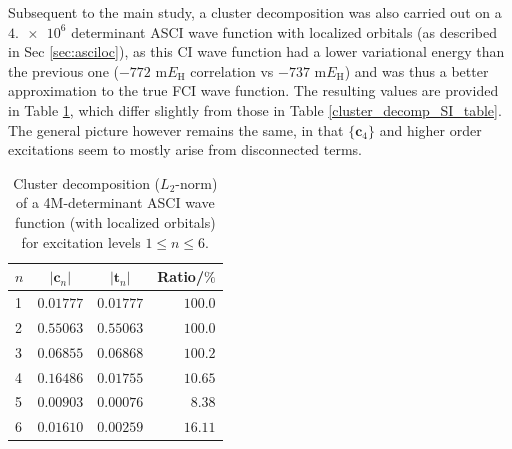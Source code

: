 \documentclass[journal=jcp,manuscript=suppinfo]{achemso}
\begin{document}
Subsequent to the main study, a cluster decomposition was also carried out on a $\num{4.e6}$ determinant ASCI wave function with localized orbitals (as described in Sec \ref{sec:asciloc}), as this CI wave function had a lower variational energy than the previous one ($-772$ m$E_{\text{H}}$ correlation vs $-737$ m$E_{\text{H}}$) and was thus a better approximation to the true FCI wave function. The resulting values are provided in Table \ref{cluster_decomp_SI_table2}, which differ slightly from those in Table \ref{cluster_decomp_SI_table}. The general picture however remains the same, in that $\{\bm{c}_4\}$ and higher order excitations seem to mostly arise from disconnected terms. 

\begin{table}[ht!]
	\begin{center}
		\caption{Cluster decomposition ($L_2$-norm) of a 4M-determinant ASCI wave function (with localized orbitals) for excitation levels $1 \leq n \leq 6$.}
		\label{cluster_decomp_SI_table2}
		\begin{tabular}{l|r|r|r}
			\toprule
			\multicolumn{1}{c|}{$n$} & \multicolumn{1}{c|}{$|\bm{c}_n|$} & \multicolumn{1}{c|}{$|\bm{t}_n|$} & \multicolumn{1}{c}{Ratio/$\%$} \\
			\midrule\midrule
			1&	$0.01777$ &	$0.01777$&	$100.0$\\
			2&	$0.55063$ &	$0.55063$&	$100.0$\\
			3&	$0.06855$ &	$0.06868$&	$100.2$\\
			4&	$0.16486$ &	$0.01755$&	$10.65$\\
			5&	$0.00903$ &	$0.00076$&	$8.38$\\
			6&	$0.01610$ &	$0.00259$&	$16.11$\\
			\midrule
		\end{tabular}
		\vspace{-0.6cm}
	\end{center}
\end{table}


\newpage



%
\end{document}
